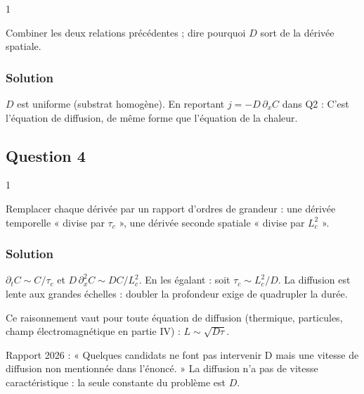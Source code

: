 \documentclass[11pt,a4paper]{article}
\newcommand{\equationajustee}[1]{%
  \sbox{\boiteequation}{$\displaystyle #1$}%
  \ifdim\wd\boiteequation>\linewidth
    \[\resizebox{\linewidth}{!}{\usebox{\boiteequation}}\]%
  \else
    \[#1\]%
  \fi}
\begin{document}
\begin{indication}{1}

Combiner les deux relations précédentes ; dire pourquoi \(D\) sort de la dérivée spatiale.

\end{indication}

\hypertarget{solution-2}{%
\subsubsection{Solution}\label{solution-2}}

\(D\) est uniforme (substrat homogène). En reportant \(j=-D\,\partial_xC\) dans Q2 :
\equationajustee{\boxed{\frac{\partial C}{\partial t}=D\,\frac{\partial^2C}{\partial x^2}}}
C'est l'équation de diffusion, de même forme que l'équation de la chaleur.

\hypertarget{question-4}{%
\subsection{Question 4}\label{question-4}}

\begin{indication}{1}

Remplacer chaque dérivée par un rapport d'ordres de grandeur : une dérivée temporelle « divise par \(\tau_c\) », une dérivée seconde spatiale « divise par \(L_c^2\) ».

\end{indication}

\hypertarget{solution-3}{%
\subsubsection{Solution}\label{solution-3}}

\(\partial_tC\sim C/\tau_c\) et \(D\,\partial_x^2C\sim DC/L_c^2\). En les égalant :
\equationajustee{\boxed{L_c\sim\sqrt{D\,\tau_c}}}
soit \(\tau_c\sim L_c^2/D\). La diffusion est lente aux grandes échelles : doubler la profondeur exige de quadrupler la durée.

\begin{methode}

Ce raisonnement vaut pour toute équation de diffusion (thermique, particules, champ électromagnétique en partie IV) : \(L\sim\sqrt{D\tau}\).

\end{methode}

\begin{piege}

Rapport 2026 : « Quelques candidats ne font pas intervenir D mais une vitesse de diffusion non mentionnée dans l'énoncé. » La diffusion n'a pas de vitesse caractéristique : la seule constante du problème est \(D\).

\end{piege}
\end{document}
